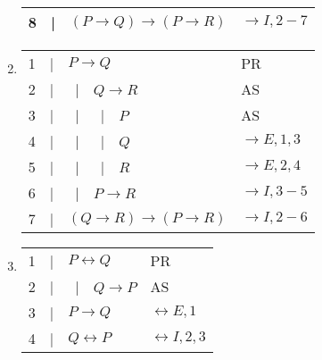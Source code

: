 \documentclass{article}
\newcommand{\asbar}{\ |\ \ }
\begin{document}
\begin{enumerate}
\begin{tabular}{llp{5cm}l}
              8 & | & $(P \to Q) \to (P \to R)$     & $\to I, 2-7$  \\
              \hline
          \end{tabular}
    \item \begin{tabular}{llp{5cm}l}
              1 & | & \underline{$P \to Q$}     & PR            \\
              2 & | & \asbar $Q \to R$          & AS            \\
              3 & | & \asbar\asbar $P$          & AS            \\
              4 & | & \asbar\asbar $Q$          & $\to E, 1, 3$ \\
              5 & | & \asbar\asbar $R$          & $\to E, 2, 4$ \\
              6 & | & \asbar $P \to R$          & $\to I, 3-5$  \\
              7 & | & $(Q \to R) \to (P \to R)$ & $\to I, 2-6$  \\
              \hline
          \end{tabular}
    \item \begin{tabular}{llp{5cm}l}
              1 & | & \underline{$P \leftrightarrow Q$} & PR                        \\
              2 & | & \asbar $Q \to P$                  & AS                        \\
              3 & | & $P \to Q$                         & $\leftrightarrow E, 1$    \\
              4 & | & $Q \leftrightarrow P$             & $\leftrightarrow I, 2, 3$ \\
              \hline
          \end{tabular}
\end{enumerate}
\end{document}
